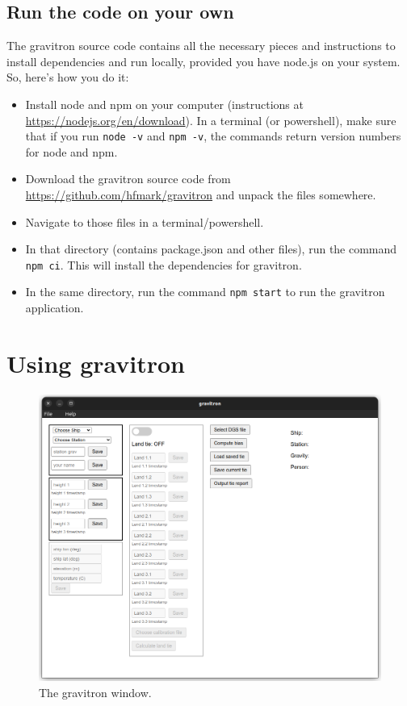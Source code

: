 \documentclass{pfpe-manual}
\begin{document}
\subsection{Run the code on your own}
The gravitron source code contains all the necessary pieces and instructions to install dependencies and run locally, provided you have node.js on your system. So, here's how you do it:
\begin{itemize}
    \item Install node and npm on your computer (instructions at \url{https://nodejs.org/en/download}). In a terminal (or powershell), make sure that if you run \texttt{node -v} and \texttt{npm -v}, the commands return version numbers for node and npm.
    \item Download the gravitron source code from \url{https://github.com/hfmark/gravitron} and unpack the files somewhere.
    \item Navigate to those files in a terminal/powershell.
    \item In that directory (contains package.json and other files), run the command \texttt{npm ci}. This will install the dependencies for gravitron.
    \item In the same directory, run the command \texttt{npm start} to run the gravitron application. 
\end{itemize}


\section{Using gravitron}

\begin{figure}[ht!]
\centering
\includegraphics[width=\textwidth]{figs/gravitron_window.png}
\caption{The gravitron window.}
\label{fig:window}
\end{figure}
\end{document}
